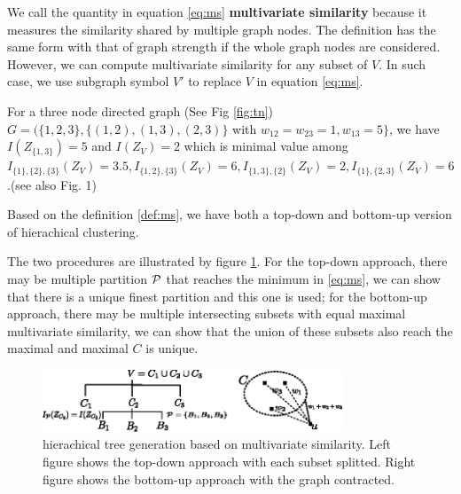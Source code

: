 \documentclass{article}
\begin{document}
We call the quantity in equation \eqref{eq:ms} \textbf{multivariate similarity} because it measures the similarity shared by multiple graph nodes. The definition has the same form with that of graph strength if  the whole graph nodes are considered\cite{RN12}. However, we can compute multivariate similarity for any subset of $V$. In such case, 
we use subgraph symbol $V'$ to replace $V$ in equation \eqref{eq:ms}.
\begin{example}\label{eg:three}
For a three node directed graph (See Fig \ref{fig:tn}) $G=(\{1,2,3\},\{(1,2),(1,3),(2,3)\}$ with $w_{12}=w_{23}=1, w_{13}=5\}$, we have $I(Z_{\{1,3\}}) = 5$ and $I(Z_V) = 2$ which is minimal value among $I_{\{1\},\{2\},\{3\}}(Z_V)=3.5, I_{\{1, 2\},\{3\}}(Z_V)=6, I_{\{1,3\},\{2\}}(Z_V)=2, I_{\{1\},\{2,3\}}(Z_V)=6$.(see also \cite{RN9} Fig. 1)
\end{example}

Based on the definition \eqref{def:ms}, we have both a top-down and bottom-up version of hierachical clustering.


The two procedures are illustrated by figure \ref{fig:ta}. For the top-down approach, there may be multiple partition $\P$ that reaches the minimum in \eqref{eq:ms}, we can show that there is a unique finest partition and this one is used; for the bottom-up approach, there may be multiple intersecting subsets with equal maximal multivariate similarity, we can show that the union of these subsets also reach the maximal and maximal $C$ is unique.
\begin{figure}
\centering
\includegraphics[width=0.8\textwidth]{pic/two_approach.eps}
\caption{hierachical tree generation based on multivariate similarity. Left figure shows the top-down approach with each subset splitted. Right figure shows the bottom-up approach with the graph contracted.}\label{fig:ta}
\end{figure}
\end{document}
